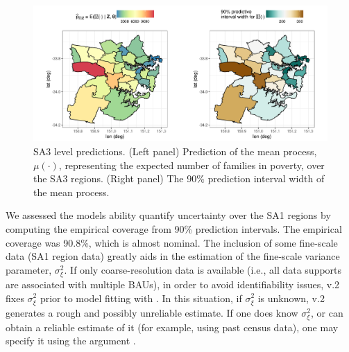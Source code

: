 \documentclass[article]{jss}
\begin{document}
\begin{figure}[t!]
    \centering
    \includegraphics[width = \linewidth]{img/Sydney_SA3_predictions.png}
    \caption{SA3 level predictions. (Left panel) Prediction of the mean process, $\mu(\cdot)$, representing the expected number of families in poverty, over the SA3 regions. (Right panel) The 90\% prediction interval width of the mean process.
}   
  \label{fig:SA3_predictions}
\end{figure}


 We assessed the models ability quantify uncertainty over the SA1 regions by computing the empirical coverage from 90\% prediction intervals. 
 The empirical coverage was 90.8\%, which is almost nominal. 
 The inclusion of some fine-scale data (SA1 region data) greatly aids in the estimation of the fine-scale variance parameter, $\sigma^2_\xi$. 
 If only coarse-resolution data is available (i.e., all data supports are associated with multiple BAUs), in order to avoid identifiability issues,  v.2 fixes $\sigma^2_\xi$ prior to model fitting with . 
 In this situation, if $\sigma^2_\xi$ is unknown,  v.2 generates a rough and possibly unreliable estimate. 
 If one does know $\sigma^2_\xi$, or can obtain a reliable estimate of it (for example, using past census data), one may specify it using the argument . 
 
  
\end{document}
